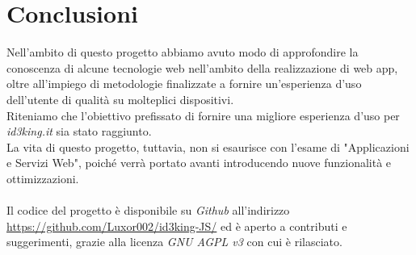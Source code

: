 \documentclass[11pt]{report}
\begin{document}
\section{Conclusioni}
Nell'ambito di questo progetto abbiamo avuto modo di approfondire la conoscenza di alcune tecnologie web nell'ambito della realizzazione di web app, oltre all'impiego di metodologie finalizzate a fornire un'esperienza d'uso dell'utente di qualità su molteplici dispositivi.
\\Riteniamo che l'obiettivo prefissato di fornire una migliore esperienza d'uso per \textit{id3king.it} sia stato raggiunto.
\\La vita di questo progetto, tuttavia, non si esaurisce con l'esame di "Applicazioni e Servizi Web", poiché verrà portato avanti introducendo nuove funzionalità e ottimizzazioni.
\\\\Il codice del progetto è disponibile su \textit{Github} all'indirizzo \url{https://github.com/Luxor002/id3king-JS/} ed è aperto a contributi e suggerimenti, grazie alla licenza \textit{GNU AGPL v3} con cui è rilasciato.
\end{document}
